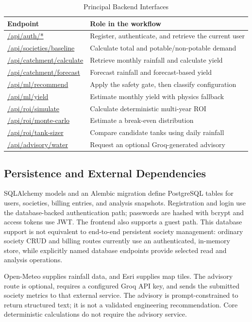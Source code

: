 \documentclass[conference]{IEEEtran}
\begin{document}
\begin{table}[htbp]
\caption{Principal Backend Interfaces}
\label{tab:api}
\centering
\small
\begin{tabular}{p{}p{}}
\toprule
\textbf{Endpoint} & \textbf{Role in the workflow}\\
\midrule
\url{/api/auth/*} & Register, authenticate, and retrieve the current user\\
\url{/api/societies/baseline} & Calculate total and potable/non-potable demand\\
\url{/api/catchment/calculate} & Retrieve monthly rainfall and calculate yield\\
\url{/api/catchment/forecast} & Forecast rainfall and forecast-based yield\\
\url{/api/ml/recommend} & Apply the safety gate, then classify configuration\\
\url{/api/ml/yield} & Estimate monthly yield with physics fallback\\
\url{/api/roi/simulate} & Calculate deterministic multi-year ROI\\
\url{/api/roi/monte-carlo} & Estimate a break-even distribution\\
\url{/api/roi/tank-sizer} & Compare candidate tanks using daily rainfall\\
\url{/api/advisory/water} & Request an optional Groq-generated advisory\\
\bottomrule
\end{tabular}
\end{table}

\subsection{Persistence and External Dependencies}

SQLAlchemy models and an Alembic migration define PostgreSQL tables for
users, societies, billing entries, and analysis snapshots. Registration
and login use the database-backed authentication path; passwords are
hashed with bcrypt and access tokens use JWT. The frontend also supports
a guest path. This database support is not equivalent to end-to-end
persistent society management: ordinary society CRUD and billing routes
currently use an authenticated, in-memory store, while explicitly named
database endpoints provide selected read and analysis operations.

Open-Meteo supplies rainfall data, and Esri supplies map tiles. The
advisory route is optional, requires a configured Groq API key, and sends
the submitted society metrics to that external service. The advisory is
prompt-constrained to return structured text; it is not a validated
engineering recommendation. Core deterministic calculations do not
require the advisory service.
\end{document}
